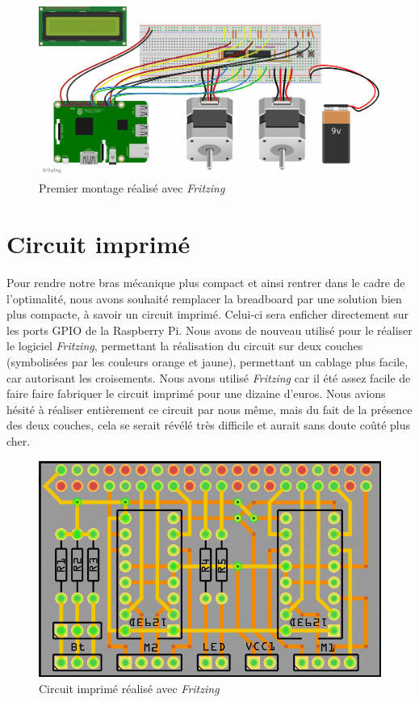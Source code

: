 \documentclass[12pt,a4paper]{report}
\begin{document}
\begin{figure}[!h]
 \center
 \includegraphics[scale=0.45]{../pictures/Sudoku_schema}
 \caption{Premier montage réalisé avec \emph{Fritzing}}
\end{figure}

\section{Circuit imprimé}
Pour rendre notre bras mécanique plus compact et ainsi rentrer dans le cadre de l'optimalité, nous avons souhaité remplacer la breadboard par une solution bien plus compacte, à savoir un circuit imprimé. Celui-ci sera enficher directement sur les ports GPIO de la Raspberry Pi. Nous avons de nouveau utilisé pour le réaliser le logiciel \emph{Fritzing}, permettant la réalisation du circuit sur deux couches (symbolisées par les couleurs orange et jaune), permettant un cablage plus facile, car autorisant les croisements. Nous avons utilisé \emph{Fritzing} car il été assez facile de faire faire fabriquer le circuit imprimé pour une dizaine d'euros. Nous avions hésité à réaliser entièrement ce circuit par nous même, mais du fait de la présence des deux couches, cela se serait révélé très difficile et aurait sans doute coûté plus cher.

\begin{figure}[!h]
 \center
 \includegraphics[scale=0.5]{../pictures/Sudoku_circuit_imprime.png}
 \caption{Circuit imprimé réalisé avec \emph{Fritzing}}
\end{figure}
\end{document}
